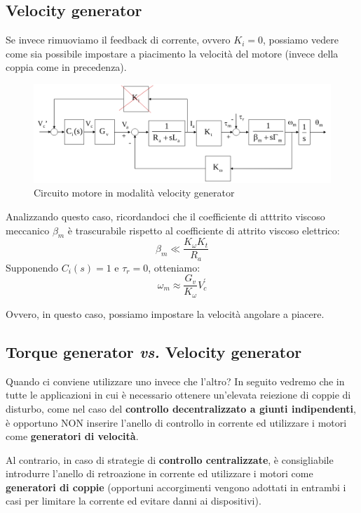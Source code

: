 \subsection{Velocity generator}

Se invece rimuoviamo il feedback di corrente, ovvero $K_i = 0$, possiamo vedere come sia possibile impostare a piacimento la velocità del motore (invece della coppia come in precedenza).

\begin{figure}[th!]
	\centering
	\includegraphics[width=0.7\linewidth]{images/electric_actuator_4}
	\caption{Circuito motore in modalità velocity generator}
	\label{fig:electricactuator4}
\end{figure}

Analizzando questo caso, ricordandoci che il coefficiente di atttrito viscoso meccanico $\beta_m$ è trascurabile rispetto al coefficiente di attrito viscoso elettrico:
$$
\beta_m \ll \frac{K_\omega K_t}{R_a}
$$
Supponendo $C_i(s) = 1$ e $\tau_r = 0$, otteniamo:
$$
\omega_m \approx \frac{G_v}{K_\omega}V^{'}_c
$$

Ovvero, in questo caso, possiamo impostare la velocità angolare a piacere.



\subsection{Torque generator \textit{vs.} Velocity generator}


Quando ci conviene utilizzare uno invece che l'altro?
In seguito vedremo che in tutte le applicazioni in cui è necessario ottenere un’elevata reiezione di coppie di disturbo, come nel caso del \textbf{controllo decentralizzato a giunti indipendenti}, è opportuno NON inserire l’anello di controllo in corrente ed utilizzare i motori come \textbf{generatori di velocità}.

Al contrario, in caso di strategie di \textbf{controllo centralizzate}, è consigliabile introdurre l’anello di retroazione in corrente ed utilizzare i motori come \textbf{generatori di coppie} (opportuni accorgimenti vengono adottati in entrambi i casi per limitare la corrente ed evitare danni ai dispositivi).

